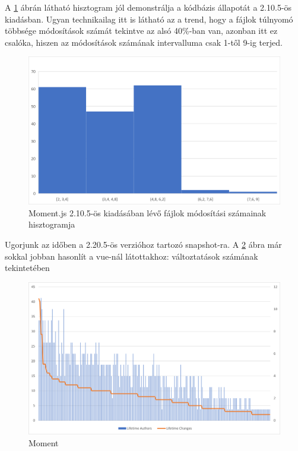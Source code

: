 A \ref{fig:moment-2.10.5-hist} ábrán látható hisztogram jól demonstrálja a kódbázis állapotát a 2.10.5-ös kiadásban. Ugyan technikailag itt is látható az a trend, hogy a fájlok túlnyomó többsége módosítások számát tekintve az alsó 40\%-ban van, azonban itt ez csalóka, hiszen az módosítások számának intervalluma csak 1-től 9-ig terjed.

\begin{figure}[H]
    \centering
    \includegraphics[width=1\textwidth]{images/moment/moment-2.10.5-hist.png}
    \caption{Moment.js 2.10.5-ös kiadásában lévő fájlok módosítási számainak hisztogramja}
    \label{fig:moment-2.10.5-hist}
\end{figure}

Ugorjunk az időben a 2.20.5-ös verzióhoz tartozó snapshot-ra. A \ref{fig:moment-2.20.5-changes} ábra már sokkal jobban hasonlít a vue-nál látottakhoz: változtatások számának tekintetében 

\begin{figure}[H]
    \centering
    \includegraphics[width=1\textwidth]{images/moment/moment-2.20.5-changes.png}
    \caption{Moment}
    \label{fig:moment-2.20.5-changes}
\end{figure}

